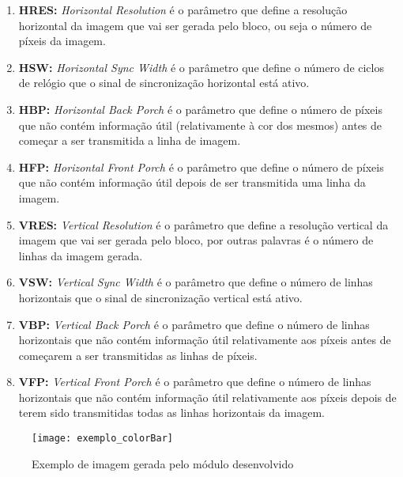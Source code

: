 \begin{enumerate}
	\item \textbf{HRES:} \textit{Horizontal Resolution} é o parâmetro que define a resolução horizontal da imagem que vai ser gerada pelo bloco, ou seja o número de píxeis da imagem.
	
	\item \textbf{HSW:} \textit{Horizontal Sync Width} é o parâmetro que define o número de ciclos de relógio que o sinal de sincronização horizontal  está ativo.
	
	\item \textbf{HBP:} \textit{Horizontal Back Porch} é o parâmetro que define o número de píxeis que não contém informação útil (relativamente à cor dos mesmos) antes de começar a ser transmitida a linha de imagem.
	
	\item \textbf{HFP:} \textit{Horizontal Front Porch} é o parâmetro que define o número de píxeis que não contém informação útil depois de ser transmitida uma linha da imagem.
	
	\item \textbf{VRES:} \textit{Vertical Resolution} é o parâmetro que define a resolução vertical da imagem que vai ser gerada pelo bloco, por outras palavras é o número de linhas da imagem gerada.
	
	\item \textbf{VSW:} \textit{Vertical Sync Width} é o parâmetro que define o número de linhas horizontais que o sinal de sincronização vertical está ativo.
	
	\item \textbf{VBP:} \textit{Vertical Back Porch} é o parâmetro que define o número de linhas horizontais que não contém informação útil relativamente aos píxeis antes de começarem a ser transmitidas as linhas de píxeis.
	
	\item \textbf{VFP:} \textit{Vertical Front Porch} é o parâmetro que define o número de linhas horizontais que não contém informação útil relativamente aos píxeis depois de terem sido transmitidas todas as linhas horizontais da imagem.
\end{enumerate}
	
\begin{figure}[h!]
	\begin{center}
		\leavevmode
		\texttt{[image: exemplo\_colorBar]}
		\caption{Exemplo de imagem gerada pelo módulo desenvolvido}
		\label{fig:colorBar_exemple}
	\end{center}
\end{figure}

